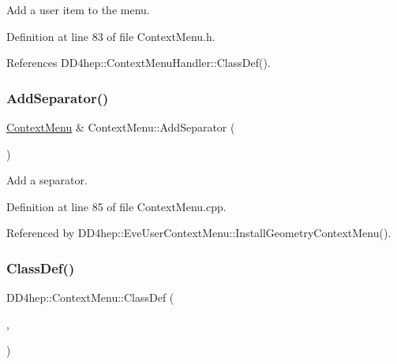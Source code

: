 Add a user item to the menu. 



Definition at line 83 of file Context\+Menu.\+h.



References D\+D4hep\+::\+Context\+Menu\+Handler\+::\+Class\+Def().

\hypertarget{class_d_d4hep_1_1_context_menu_a4f500b58c95613e4b6a05a1b31d03a99}{}\label{class_d_d4hep_1_1_context_menu_a4f500b58c95613e4b6a05a1b31d03a99} 
\subsubsection{\texorpdfstring{Add\+Separator()}{AddSeparator()}}
{\footnotesize\ttfamily \hyperlink{class_d_d4hep_1_1_context_menu}{Context\+Menu} \& Context\+Menu\+::\+Add\+Separator (\begin{DoxyParamCaption}{ }\end{DoxyParamCaption})}



Add a separator. 



Definition at line 85 of file Context\+Menu.\+cpp.



Referenced by D\+D4hep\+::\+Eve\+User\+Context\+Menu\+::\+Install\+Geometry\+Context\+Menu().

\hypertarget{class_d_d4hep_1_1_context_menu_a2f6ab4ffe0c386047b6922c267e0fba7}{}\label{class_d_d4hep_1_1_context_menu_a2f6ab4ffe0c386047b6922c267e0fba7} 
\subsubsection{\texorpdfstring{Class\+Def()}{ClassDef()}}
{\footnotesize\ttfamily D\+D4hep\+::\+Context\+Menu\+::\+Class\+Def (\begin{DoxyParamCaption}\item[{\hyperlink{class_d_d4hep_1_1_context_menu}{Context\+Menu}}]{,  }\item[{0}]{ }\end{DoxyParamCaption})}



